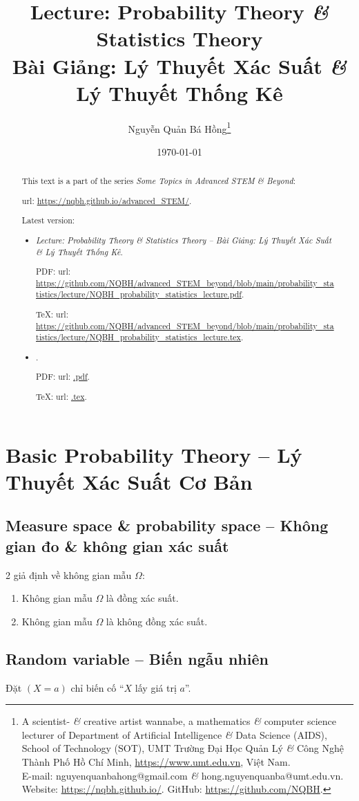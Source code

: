 \documentclass{article}
\title{Lecture: Probability Theory {\it\&} Statistics Theory\\Bài Giảng: Lý Thuyết Xác Suất {\it\&} Lý Thuyết Thống Kê}
\author{Nguyễn Quản Bá Hồng\footnote{A scientist- {\it\&} creative artist wannabe, a mathematics {\it\&} computer science lecturer of Department of Artificial Intelligence {\it\&} Data Science (AIDS), School of Technology (SOT), UMT Trường Đại Học Quản Lý {\it\&} Công Nghệ Thành Phố Hồ Chí Minh, \url{https://www.umt.edu.vn}, Việt Nam.\\E-mail: {\sf nguyenquanbahong@gmail.com} {\it\&} {\sf hong.nguyenquanba@umt.edu.vn}. Website: \url{https://nqbh.github.io/}. GitHub: \url{https://github.com/NQBH}.}}
\date{\today}
\begin{document}
\maketitle
\begin{abstract}
	This text is a part of the series {\it Some Topics in Advanced STEM \& Beyond}:
	
	{\sc url}: \url{https://nqbh.github.io/advanced_STEM/}.
	
	Latest version:
	\begin{itemize}
		\item {\it Lecture: Probability Theory \& Statistics Theory -- Bài Giảng: Lý Thuyết Xác Suất \& Lý Thuyết Thống Kê}.
		
		PDF: {\sc url}: \url{https://github.com/NQBH/advanced_STEM_beyond/blob/main/probability_statistics/lecture/NQBH_probability_statistics_lecture.pdf}.
		
		\TeX: {\sc url}: \url{https://github.com/NQBH/advanced_STEM_beyond/blob/main/probability_statistics/lecture/NQBH_probability_statistics_lecture.tex}.
		\item {\it }.
		
		PDF: {\sc url}: \url{.pdf}.
		
		\TeX: {\sc url}: \url{.tex}.
	\end{itemize}
\end{abstract}
\tableofcontents


\section{Basic Probability Theory -- Lý Thuyết Xác Suất Cơ Bản}

\subsection{Measure space \& probability space -- Không gian đo \& không gian xác suất}
2 giả định về không gian mẫu $\Omega$:
\begin{enumerate}
	\item Không gian mẫu $\Omega$ là đồng xác suất.
	\item Không gian mẫu $\Omega$ là không đồng xác suất.
\end{enumerate}


\subsection{Random variable -- Biến ngẫu nhiên}
Đặt $(X = a)$ chỉ biến cố ``$X$ lấy giá trị $a$''.
\end{document}
